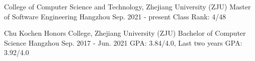 \begin{cventries}

	\cventry
	{College of Computer Science and Technology, Zhejiang University (ZJU)} %
	{Master of Software Engineering} %
	{Hangzhou} %
	{Sep. 2021 - present} %
	{
		Class Rank: 4/48
	}%
	\vspace{1mm}

	\cventry
	{Chu Kochen Honors College, Zhejiang University (ZJU)} %
	{Bachelor of Computer Science} %
	{Hangzhou} %
	{Sep. 2017 - Jun. 2021} %
	{
		GPA: 3.84/4.0, Last two years GPA: 3.92/4.0
	}%
	\vspace{1mm}
\end{cventries}
